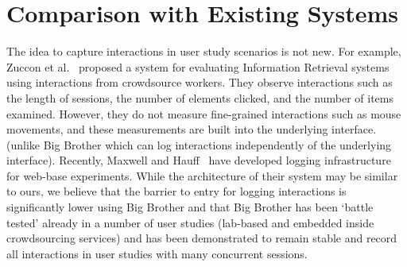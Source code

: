 \section{Comparison with Existing Systems}

The idea to capture interactions in user study scenarios is not new. For example, Zuccon et al.~\cite{zuccon2013crowdsourcing} proposed a system for evaluating Information Retrieval systems using interactions from crowdsource workers. They observe interactions such as the length of sessions, the number of elements clicked, and the number of items examined. However, they do not measure fine-grained interactions such as mouse movements, and these measurements are built into the underlying interface. (unlike Big Brother which can log interactions independently of the underlying interface). Recently, Maxwell and Hauff~\cite{maxwell2021logui} have developed logging infrastructure for web-base experiments. While the architecture of their system may be similar to ours, we believe that the barrier to entry for logging interactions is significantly lower using Big Brother and that Big Brother has been `battle tested' already in a number of user studies (lab-based and embedded inside crowdsourcing services) and has been demonstrated to remain stable and record all interactions in user studies with many concurrent sessions.